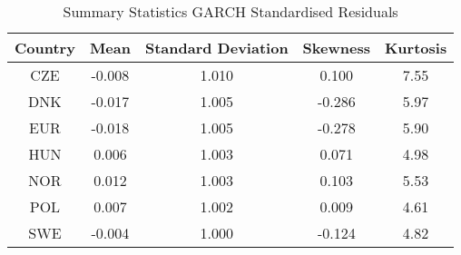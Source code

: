 \begin{table}[!h]
\centering
\caption{Summary Statistics GARCH Standardised Residuals}
\centering
\begin{tabular}[t]{ccccc}
\toprule
Country & Mean & Standard Deviation & Skewness & Kurtosis\\
\midrule
CZE & -0.008 & 1.010 & 0.100 & 7.55\\
DNK & -0.017 & 1.005 & -0.286 & 5.97\\
EUR & -0.018 & 1.005 & -0.278 & 5.90\\
HUN & 0.006 & 1.003 & 0.071 & 4.98\\
NOR & 0.012 & 1.003 & 0.103 & 5.53\\
\addlinespace
POL & 0.007 & 1.002 & 0.009 & 4.61\\
SWE & -0.004 & 1.000 & -0.124 & 4.82\\
\bottomrule
\end{tabular}
\end{table}
